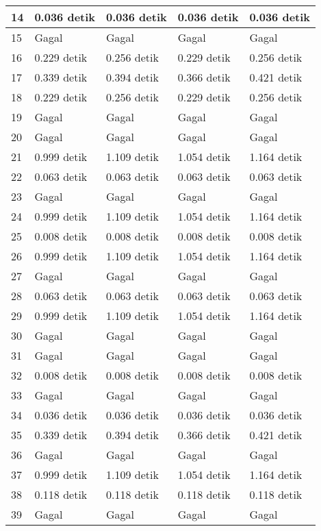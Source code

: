 \begin{table}
\begin{tabular}{| l | l | l | l | l |}
\hline
14 & 0.036 detik & 0.036 detik & 0.036 detik & 0.036 detik \\
\hline
15 & Gagal & Gagal & Gagal & Gagal \\
\hline
16 & 0.229 detik & 0.256 detik & 0.229 detik & 0.256 detik \\
\hline
17 & 0.339 detik & 0.394 detik & 0.366 detik & 0.421 detik \\
\hline
18 & 0.229 detik & 0.256 detik & 0.229 detik & 0.256 detik \\
\hline
19 & Gagal & Gagal & Gagal & Gagal \\
\hline
20 & Gagal & Gagal & Gagal & Gagal \\
\hline
21 & 0.999 detik & 1.109 detik & 1.054 detik & 1.164 detik \\
\hline
22 & 0.063 detik & 0.063 detik & 0.063 detik & 0.063 detik \\
\hline
23 & Gagal & Gagal & Gagal & Gagal \\
\hline
24 & 0.999 detik & 1.109 detik & 1.054 detik & 1.164 detik \\
\hline
25 & 0.008 detik & 0.008 detik & 0.008 detik & 0.008 detik \\
\hline
26 & 0.999 detik & 1.109 detik & 1.054 detik & 1.164 detik \\
\hline
27 & Gagal & Gagal & Gagal & Gagal \\
\hline
28 & 0.063 detik & 0.063 detik & 0.063 detik & 0.063 detik \\
\hline
29 & 0.999 detik & 1.109 detik & 1.054 detik & 1.164 detik \\
\hline
30 & Gagal & Gagal & Gagal & Gagal \\
\hline
31 & Gagal & Gagal & Gagal & Gagal \\
\hline
32 & 0.008 detik & 0.008 detik & 0.008 detik & 0.008 detik \\
\hline
33 & Gagal & Gagal & Gagal & Gagal \\
\hline
34 & 0.036 detik & 0.036 detik & 0.036 detik & 0.036 detik \\
\hline
35 & 0.339 detik & 0.394 detik & 0.366 detik & 0.421 detik \\
\hline
36 & Gagal & Gagal & Gagal & Gagal \\
\hline
37 & 0.999 detik & 1.109 detik & 1.054 detik & 1.164 detik \\
\hline
38 & 0.118 detik & 0.118 detik & 0.118 detik & 0.118 detik \\
\hline
39 & Gagal & Gagal & Gagal & Gagal \\
\hline
\end{tabular}
\label{tab:hasilhg4x42}
\end{table}


